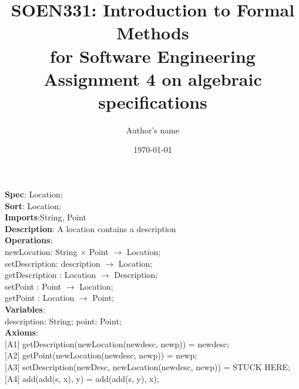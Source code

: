 \documentclass[12pt]{article}
\title{SOEN331: Introduction to Formal Methods\\for Software Engineering\\
Assignment 4 on algebraic specifications}
\author{Author's name}
\date{\today}
\begin{document}
\begin{spacing}{1.5}

\maketitle

\noindent \textbf{Spec}: Location;\\
\noindent \textbf{Sort}: Location;\\
\noindent \textbf{Imports}:String, Point\\
\noindent \textbf{Description}: A location contains a description \\
\noindent \textbf{Operations}:\\
\hspace*{5mm} newLocation: String $\times$ Point $\rightarrow$ Location;\\
\hspace*{5mm} setDescription: description $\rightarrow$ Location;\\
\hspace*{5mm} getDescription : Location $\rightarrow$ Description;\\
\hspace*{5mm} setPoint : Point $\rightarrow$ Location;\\
\hspace*{5mm} getPoint : Location $\rightarrow$ Point;\\
\noindent \textbf{Variables}:\\
\hspace*{5mm} description: String; point: Point;\\
\noindent \textbf{Axioms}:\\
\hspace*{5mm} [A1] getDescription(newLocation(newdesc, newp)) = newdesc;\\
\hspace*{5mm} [A2] getPoint(newLocation(newdesc, newp)) = newp;\\
\hspace*{5mm} [A3] setDescription(newDesc, newLocation(newdesc, newp)) = STUCK HERE;\\
\hspace*{5mm} [A4] add(add(s, x), y) = add(add(s, y), x);\\



\end{spacing}
\end{document}

